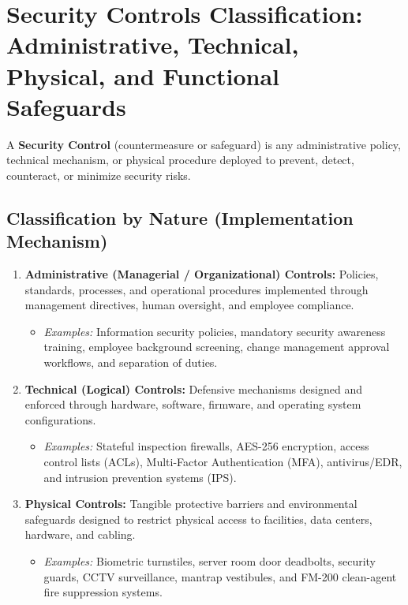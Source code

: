 \newpage
\section{Security Controls Classification: Administrative, Technical, Physical, and Functional Safeguards}

A \textbf{Security Control} (countermeasure or safeguard) is any administrative policy, technical mechanism, or physical procedure deployed to prevent, detect, counteract, or minimize security risks.

\subsection{Classification by Nature (Implementation Mechanism)}

\begin{enumerate}
\item \textbf{Administrative (Managerial / Organizational) Controls:}
Policies, standards, processes, and operational procedures implemented through management directives, human oversight, and employee compliance.
\begin{itemize}
\item \textit{Examples:} Information security policies, mandatory security awareness training, employee background screening, change management approval workflows, and separation of duties.
\end{itemize}
\item \textbf{Technical (Logical) Controls:}
Defensive mechanisms designed and enforced through hardware, software, firmware, and operating system configurations.
\begin{itemize}
\item \textit{Examples:} Stateful inspection firewalls, AES-256 encryption, access control lists (ACLs), Multi-Factor Authentication (MFA), antivirus/EDR, and intrusion prevention systems (IPS).
\end{itemize}
\item \textbf{Physical Controls:}
Tangible protective barriers and environmental safeguards designed to restrict physical access to facilities, data centers, hardware, and cabling.
\begin{itemize}
\item \textit{Examples:} Biometric turnstiles, server room door deadbolts, security guards, CCTV surveillance, mantrap vestibules, and FM-200 clean-agent fire suppression systems.
\end{itemize}
\end{enumerate}

